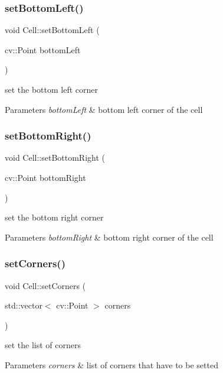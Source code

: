 \subsubsection{\texorpdfstring{set\+Bottom\+Left()}{setBottomLeft()}}
{\footnotesize\ttfamily void Cell\+::set\+Bottom\+Left (\begin{DoxyParamCaption}\item[{cv\+::\+Point}]{bottom\+Left }\end{DoxyParamCaption})}

set the bottom left corner 
\begin{DoxyParams}{Parameters}
{\em bottom\+Left} & bottom left corner of the cell \\
\hline
\end{DoxyParams}
\mbox{\label{class_cell_ae68ff90cfde34cec208e8e74ce3f2745}} 
\subsubsection{\texorpdfstring{set\+Bottom\+Right()}{setBottomRight()}}
{\footnotesize\ttfamily void Cell\+::set\+Bottom\+Right (\begin{DoxyParamCaption}\item[{cv\+::\+Point}]{bottom\+Right }\end{DoxyParamCaption})}

set the bottom right corner 
\begin{DoxyParams}{Parameters}
{\em bottom\+Right} & bottom right corner of the cell \\
\hline
\end{DoxyParams}
\mbox{\label{class_cell_a6d1ad0f2766cdd641ba0e65f8b3c9555}} 
\subsubsection{\texorpdfstring{set\+Corners()}{setCorners()}}
{\footnotesize\ttfamily void Cell\+::set\+Corners (\begin{DoxyParamCaption}\item[{std\+::vector$<$ cv\+::\+Point $>$}]{corners }\end{DoxyParamCaption})}

set the list of corners 
\begin{DoxyParams}{Parameters}
{\em corners} & list of corners that have to be setted \\
\hline
\end{DoxyParams}
\mbox{\label{class_cell_a6047939b792e819bc2330151ff98864f}} 
